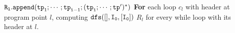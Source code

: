 \begin{algorithm}
\begin{algorithmic}[1]
  $\mathtt{R_l.append(\mathtt{tp}_1; \cdots; \mathtt{tp}_{i - 1}; (\mathtt{tp}_i; \cdots; \mathtt{tp}')^*)}$
  \STATE \quad \quad  {}
    \STATE \textbf{For} each loop $c_{l}$ with header at program point $l$, 
    \STATE \quad {}
    \STATE \quad {}
    \STATE \quad computing $\mathtt{dfs([], I_0, [I_0] )}$
  \RETURN $R_l$ for every while loop with its header at $l$.
  \end{algorithmic}
  \end{algorithm}

